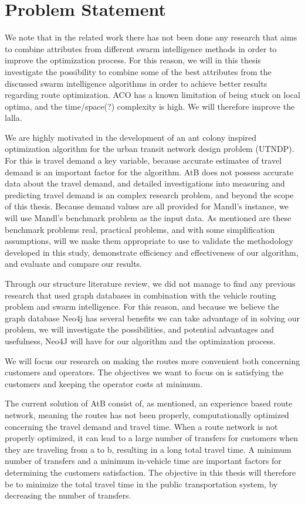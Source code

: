 \section{Problem Statement} 

We note that in the related work there has not been done any research that aims to combine attributes from different swarm intelligence methods in order to improve the optimization process. For this reason, we will in this thesis investigate the possibility to combine some of the best attributes from the discussed swarm intelligence algorithms in order to achieve better results regarding route optimization. ACO has a known limitation of being stuck on local optima, and the time/space(?) complexity is high. We will therefore improve the lalla.

We are highly motivated in the development of an ant colony inspired optimization algorithm for the urban transit network design problem (UTNDP). For this is travel demand a key variable, because accurate estimates of travel demand is an important factor for the algorithm. AtB does not possess accurate data about the travel demand, and detailed investigations into measuring and predicting travel demand is an complex research problem, and beyond the scope of this thesis. Because demand values are all provided for Mandl's instance, we will use Mandl's benchmark problem \citep{mandl79} as the input data. As mentioned are these benchmark problems real, practical problems, and with some simplification assumptions, will we make them appropriate to use to validate the methodology developed in this study, demonstrate efficiency and effectiveness of our algorithm, and evaluate and compare our results. 

Through our structure literature review, we did not manage to find any previous research that used graph databases in combination with the vehicle routing problem and swarm intelligence. For this reason, and because we believe the graph database Neo4j \citep{website:neo4j} has several benefits we can take advantage of in solving our problem, we will investigate the possibilities, and potential advantages and usefulness, Neo4J will have for our algorithm and the optimization process.

We will focus our research on making the routes more convenient both concerning customers and operators. The objectives we want to focus on is satisfying the customers and keeping the operator costs at minimum. 

The current solution of AtB \citep{website:atb} consist of, as mentioned, an experience based route network, meaning the routes has not been properly, computationally optimized concerning the travel demand and travel time. When a route network is not properly optimized, it can lead to a large number of transfers for customers when they are traveling from a to b, resulting in a long total travel time. A minimum number of transfers and a minimum in-vehicle time are important factors for determining the customers satisfaction. The objective in this thesis will therefore be to minimize the total travel time in the public transportation system, by decreasing the number of transfers. %

